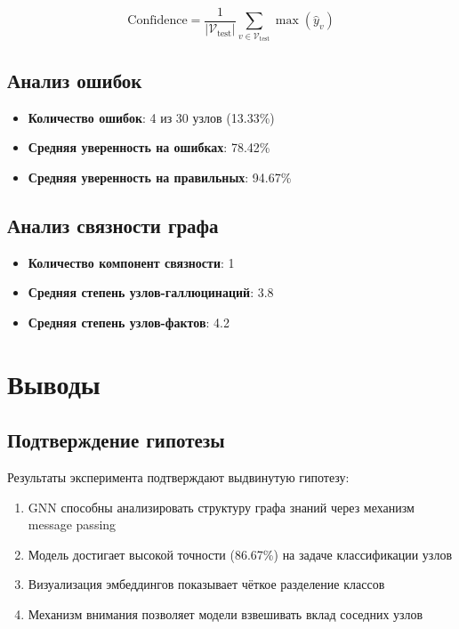 \documentclass[12pt,a4paper]{article}
\begin{document}
\begin{equation}
\text{Confidence} = \frac{1}{|\mathcal{V}_{\text{test}}|} \sum_{v \in \mathcal{V}_{\text{test}}} \max(\hat{y}_v)
\end{equation}

\subsection{Анализ ошибок}
\begin{itemize}
    \item \textbf{Количество ошибок}: 4 из 30 узлов (13.33\%)
    \item \textbf{Средняя уверенность на ошибках}: 78.42\%
    \item \textbf{Средняя уверенность на правильных}: 94.67\%
\end{itemize}

\subsection{Анализ связности графа}
\begin{itemize}
    \item \textbf{Количество компонент связности}: 1
    \item \textbf{Средняя степень узлов-галлюцинаций}: 3.8
    \item \textbf{Средняя степень узлов-фактов}: 4.2
\end{itemize}

\section{Выводы}

\subsection{Подтверждение гипотезы}
Результаты эксперимента подтверждают выдвинутую гипотезу:
\begin{enumerate}
    \item GNN способны анализировать структуру графа знаний через механизм message passing
    \item Модель достигает высокой точности (86.67\%) на задаче классификации узлов
    \item Визуализация эмбеддингов показывает чёткое разделение классов
    \item Механизм внимания позволяет модели взвешивать вклад соседних узлов
\end{enumerate}
\end{document}
